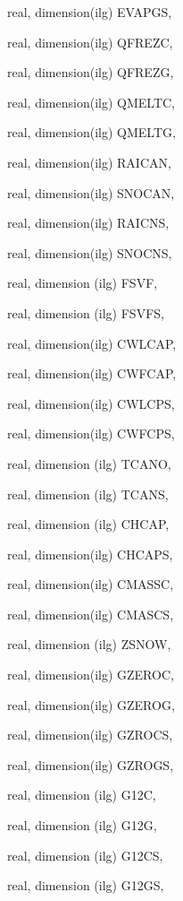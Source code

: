 {\begin{DoxyParamCaption}
\item[{real, dimension(ilg)}]{E\+V\+A\+P\+G\+S, }
\item[{real, dimension(ilg)}]{Q\+F\+R\+E\+Z\+C, }
\item[{real, dimension(ilg)}]{Q\+F\+R\+E\+Z\+G, }
\item[{real, dimension(ilg)}]{Q\+M\+E\+L\+T\+C, }
\item[{real, dimension(ilg)}]{Q\+M\+E\+L\+T\+G, }
\item[{real, dimension(ilg)}]{R\+A\+I\+C\+A\+N, }
\item[{real, dimension(ilg)}]{S\+N\+O\+C\+A\+N, }
\item[{real, dimension(ilg)}]{R\+A\+I\+C\+N\+S, }
\item[{real, dimension(ilg)}]{S\+N\+O\+C\+N\+S, }
\item[{real, dimension  (ilg)}]{F\+S\+V\+F, }
\item[{real, dimension (ilg)}]{F\+S\+V\+F\+S, }
\item[{real, dimension(ilg)}]{C\+W\+L\+C\+A\+P, }
\item[{real, dimension(ilg)}]{C\+W\+F\+C\+A\+P, }
\item[{real, dimension(ilg)}]{C\+W\+L\+C\+P\+S, }
\item[{real, dimension(ilg)}]{C\+W\+F\+C\+P\+S, }
\item[{real, dimension (ilg)}]{T\+C\+A\+N\+O, }
\item[{real, dimension (ilg)}]{T\+C\+A\+N\+S, }
\item[{real, dimension (ilg)}]{C\+H\+C\+A\+P, }
\item[{real, dimension(ilg)}]{C\+H\+C\+A\+P\+S, }
\item[{real, dimension(ilg)}]{C\+M\+A\+S\+S\+C, }
\item[{real, dimension(ilg)}]{C\+M\+A\+S\+C\+S, }
\item[{real, dimension (ilg)}]{Z\+S\+N\+O\+W, }
\item[{real, dimension(ilg)}]{G\+Z\+E\+R\+O\+C, }
\item[{real, dimension(ilg)}]{G\+Z\+E\+R\+O\+G, }
\item[{real, dimension(ilg)}]{G\+Z\+R\+O\+C\+S, }
\item[{real, dimension(ilg)}]{G\+Z\+R\+O\+G\+S, }
\item[{real, dimension  (ilg)}]{G12\+C, }
\item[{real, dimension  (ilg)}]{G12\+G, }
\item[{real, dimension (ilg)}]{G12\+C\+S, }
\item[{real, dimension (ilg)}]{G12\+G\+S, }

\end{DoxyParamCaption}}
